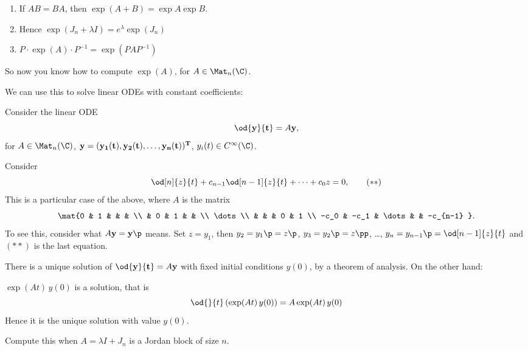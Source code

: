 \begin{exercises}
\mbox{}
\begin{enumerate}
	\shortskip
	\item If $AB=BA$, then $\exp(A+B) = \exp A \exp B$.
	\item Hence $\exp(J_n+\lambda I) = e^\lambda \exp(J_n)$
	\item $P\cdot \exp(A) \cdot P^{-1} = \exp(PAP^{-1})$
\end{enumerate}
\end{exercises}

So now you know how to compute $\exp(A)$, for $A\in\Mat_n(\C)$.

We can use this to solve linear ODEs with constant coefficients:

Consider the linear ODE
\begin{equation*}
	\od{\bf{y}}{t} = A\bf{y},
\end{equation*}
for $A\in\Mat_n(\C)$, $\bf{y}=(y_1(t), y_2(t), \dots, y_n(t))^T$, $y_i(t)\in C^\infty(\C)$.

\begin{example}
	Consider %
	\begin{equation*}
		\od[n]{z}{t} + c_{n-1} \od[n-1]{z}{t} + \cdots + c_0 z = 0,  \tag{$**$}
	\end{equation*}
This is a particular case of the above, where $A$ is the matrix 
$$\mat{0 & 1 &    &   &   \\
        & 0 & 1  &   &    \\
        \dots             \\
        &   &    & 0 & 1  \\
      -c_0 & -c_1 & \dots & & -c_{n-1}
}.$$
To see this, consider what 
	$A\bf{y} = \bf{y}\p$ means.  Set $z=y_1$, then $y_2=y_1\p=z\p$, $y_3=y_2\p=z\pp$, \ldots, $y_n=y_{n-1}\p = \od[n-1]{z}{t}$ and $(**)$ is the last equation. %
\end{example}
	
	There is a unique solution of $\od{\bf{y}}{t} = A\bf{y}$ with fixed initial conditions $y(0)$, by a theorem of analysis. On the other hand: %


\begin{exercise}
	$\exp(At)\,y(0)$ is a solution, that is
	\begin{equation*}
		\od{}{t}\left( \exp(At)\,y(0) \right)=A\exp(At)\,y(0)
	\end{equation*}
	Hence it is the unique solution with value $y(0)$. %
	
	Compute this when $A=\lambda I + J_n$ is a Jordan block of size $n$.
\end{exercise}

